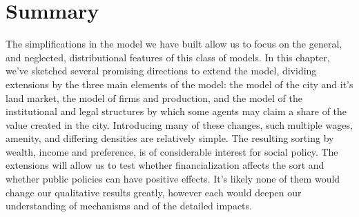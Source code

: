 


\section{Summary}
The simplifications in the model we have built
allow us to focus on the general, and neglected, distributional features of this class of models. In this chapter, we've sketched several promising directions to extend the model, 
dividing extensions by the three main elements of the model: the model of the city and it's land market, the model of firms and production, and the model of the institutional and legal structures by which some agents may claim a share of the value created in the city. %
Introducing many of these changes, such multiple wages, amenity, and differing densities are relatively simple. The resulting sorting by wealth, income and preference, is of considerable interest for social policy. The extensions will allow us to test whether financialization affects the sort and whether public policies can have positive effects. It's likely none of them would change our qualitative results greatly, however each would deepen our understanding of mechanisms and of the detailed impacts. 


